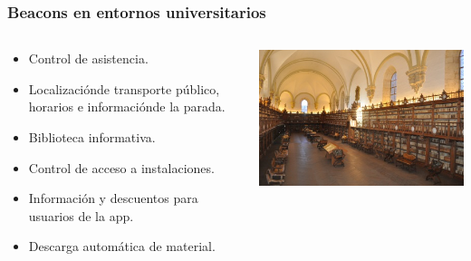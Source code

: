 
\begin{frame}
	\frametitle{Beacons en entornos universitarios}
		\begin{columns}
			\begin{column}{0.6\textwidth}
					\begin{itemize}
						\item Control de asistencia.
						\item Localizaciónde transporte público, horarios e informaciónde la parada.
						\item Biblioteca informativa.
						\item Control de acceso a instalaciones.
						\item Información y descuentos para usuarios de la app.
						\item Descarga automática de material.
					\end{itemize}
				\endblock{}
			\end{column}
			\begin{column}{0.4\textwidth}
				\vfill 
				\begin{center}
					\includegraphics[width=0.9\linewidth]{Images/BibliotecaSalamanca}
				\end{center}
			\end{column}		
		\end{columns}
\end{frame}
